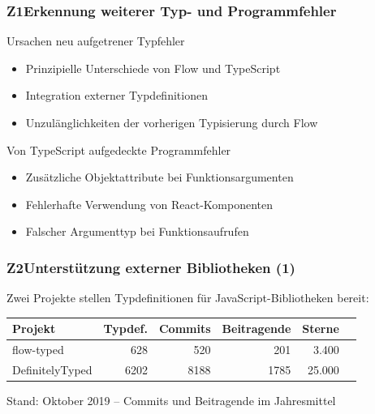       \begin{frame}
        \frametitle{Z1\hspace{0.75em}Erkennung weiterer Typ- und Programmfehler}
        \begin{block}{Ursachen neu aufgetrener Typfehler}
          \begin{itemize}
            \item Prinzipielle Unterschiede von Flow und TypeScript
            \item Integration externer Typdefinitionen
            \item Unzulänglichkeiten der vorherigen Typisierung durch Flow
          \end{itemize}
        \end{block}
        \smallskip
        \begin{block}{Von TypeScript aufgedeckte Programmfehler}
          \begin{itemize}
            \item Zusätzliche Objektattribute bei Funktionsargumenten
            \item Fehlerhafte Verwendung von React-Komponenten
            \item Falscher Argumenttyp bei Funktionsaufrufen
          \end{itemize}
        \end{block}
      \end{frame}

      \begin{frame}
        \frametitle{Z2\hspace{0.75em}Unterstützung externer Bibliotheken (1)}
        Zwei Projekte stellen Typdefinitionen für JavaScript-Bibliotheken bereit:\\[1.5em]
        {
          \footnotesize
          \begin{tabu} to 
            \midrule
            \rowfont{\bfseries} Projekt & Typdef. & Commits & Beitragende & Sterne & {} \\
            \midrule
            flow-typed      &  628 &  520 &  201 &  3.400 & \autocite{FLOW_TYPED} \\
            DefinitelyTyped & 6202 & 8188 & 1785 & 25.000 & \autocite{DEFINITELY_TYPED} \\
            \midrule
          \end{tabu}
          \vspace{1em}
          Stand: Oktober 2019 -- Commits und Beitragende im Jahresmittel
        }
      \end{frame}

